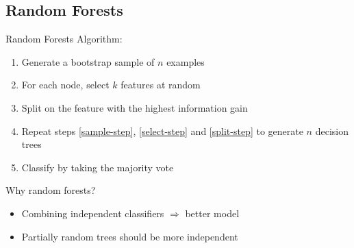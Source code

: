 \documentclass[14pt]{beamer}
\begin{document}
\subsection{Random Forests}

\begin{frame}{Random Forests}
\pause
Algorithm:
\begin{enumerate}
\item\label{sample-step} Generate a bootstrap sample of $n$ examples
\item\label{select-step} For each node, select $k$ features at random
\item\label{split-step} Split on the feature with the highest information gain
\item Repeat steps \ref{sample-step}, \ref{select-step} and \ref{split-step} to generate $n$ decision trees
\item Classify by taking the majority vote
\end{enumerate}
\pause
\bigskip
Why random forests?
\begin{itemize}
\item Combining independent classifiers $\Rightarrow$ better model
\item Partially random trees should be more independent
\end{itemize}
\end{frame}
\end{document}
